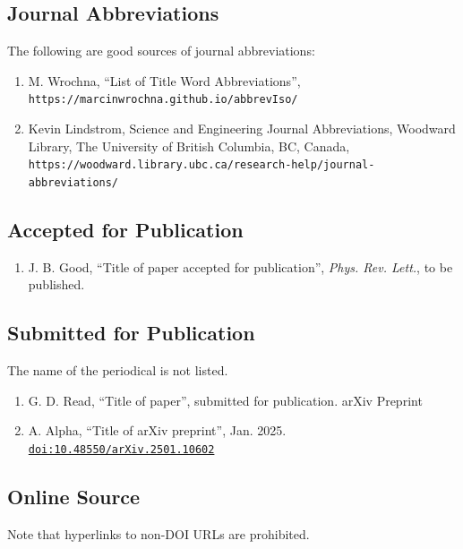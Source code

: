 \documentclass[%
               hyphens,       %
               ]{jacow}
\begin{document}
\subsection{Journal Abbreviations}

The following are good sources of journal abbreviations:
\begin{enumerate}[leftmargin=22pt, resume*]\small
	\item M. Wrochna, “List of Title Word Abbreviations”,
		\nolinkurl{https://marcinwrochna.github.io/abbrevIso/}

	\item  Kevin Lindstrom, Science and Engineering Journal Abbreviations, Woodward Library, 
		The University of British Columbia, BC, Canada, 
		\nolinkurl{https://woodward.library.ubc.ca/research-help/journal-abbreviations/}
\end{enumerate}

\subsection{Accepted for Publication}

\begin{enumerate}[leftmargin=22pt, resume*]
	\item J. B. Good, “Title of paper accepted for publication”, 
		\textit{Phys. Rev. Lett.}, to be published.
\end{enumerate}

\subsection{Submitted for Publication}

The name of the periodical is not listed.

\begin{enumerate}[leftmargin=22pt, resume*]
	\item G. D. Read, “Title of paper”, submitted for publication.
		arXiv Preprint

	\item  A. Alpha, “Title of arXiv preprint”, Jan. 2025. 
		\href{https://doi.org/10.48550/arXiv.2501.10602}%
			 {\texttt{doi:10.48550/arXiv.2501.10602}}
\end{enumerate}

\subsection{Online Source}

Note that hyperlinks to non-DOI URLs are prohibited.
\end{document}
